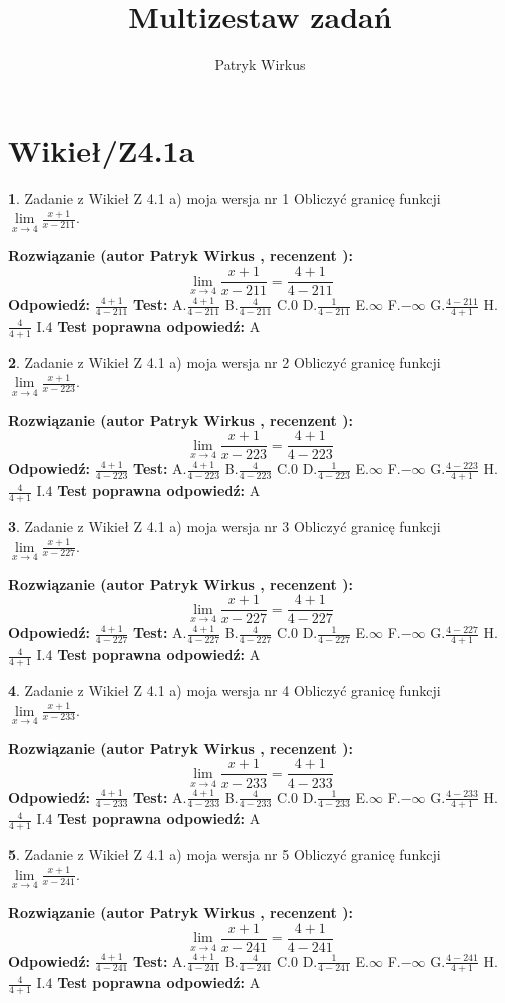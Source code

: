 \documentclass[12pt, a4paper]{article}
\title{Multizestaw zadań}
\author{Patryk Wirkus}
\date{}
\theoremstyle{definition} %
\newtheorem{zad}{}
\newcommand{\kategoria}[1]{\section{#1}}
\newcommand{\zadStart}[1]{\begin{zad}#1\newline}
\newcommand{\zadStop}{\end{zad}}
\newcommand{\rozwStart}[2]{\noindent \textbf{Rozwiązanie (autor #1 , recenzent #2): }\newline}
\newcommand{\rozwStop}{\newline}
\newcommand{\odpStart}{\noindent \textbf{Odpowiedź:}\newline}
\newcommand{\odpStop}{\newline}
\newcommand{\testStart}{\noindent \textbf{Test:}\newline}
\newcommand{\testStop}{\newline}
\newcommand{\kluczStart}{\noindent \textbf{Test poprawna odpowiedź:}\newline}
\newcommand{\kluczStop}{\newline}
\begin{document}
\maketitle

\kategoria{Wikieł/Z4.1a}


\zadStart{Zadanie z Wikieł Z 4.1 a) moja wersja nr 1}
Obliczyć granicę funkcji $\lim\limits_{x\to4}\frac{x+1}{x-211}$.
\zadStop
\rozwStart{Patryk Wirkus}{}
$$\lim\limits_{x\to4}\frac{x+1}{x-211} = \frac{4+1}{4-211}$$
\rozwStop
\odpStart
$\frac{4+1}{4-211}$
\odpStop
\testStart
A.$\frac{4+1}{4-211}$
B.$\frac{4}{4-211}$
C.$0$
D.$\frac{1}{4-211}$
E.$\infty$
F.$-\infty$
G.$\frac{4-211}{4+1}$
H.$\frac{4}{4+1}$
I.$4$
\testStop
\kluczStart
A
\kluczStop



\zadStart{Zadanie z Wikieł Z 4.1 a) moja wersja nr 2}
Obliczyć granicę funkcji $\lim\limits_{x\to4}\frac{x+1}{x-223}$.
\zadStop
\rozwStart{Patryk Wirkus}{}
$$\lim\limits_{x\to4}\frac{x+1}{x-223} = \frac{4+1}{4-223}$$
\rozwStop
\odpStart
$\frac{4+1}{4-223}$
\odpStop
\testStart
A.$\frac{4+1}{4-223}$
B.$\frac{4}{4-223}$
C.$0$
D.$\frac{1}{4-223}$
E.$\infty$
F.$-\infty$
G.$\frac{4-223}{4+1}$
H.$\frac{4}{4+1}$
I.$4$
\testStop
\kluczStart
A
\kluczStop



\zadStart{Zadanie z Wikieł Z 4.1 a) moja wersja nr 3}
Obliczyć granicę funkcji $\lim\limits_{x\to4}\frac{x+1}{x-227}$.
\zadStop
\rozwStart{Patryk Wirkus}{}
$$\lim\limits_{x\to4}\frac{x+1}{x-227} = \frac{4+1}{4-227}$$
\rozwStop
\odpStart
$\frac{4+1}{4-227}$
\odpStop
\testStart
A.$\frac{4+1}{4-227}$
B.$\frac{4}{4-227}$
C.$0$
D.$\frac{1}{4-227}$
E.$\infty$
F.$-\infty$
G.$\frac{4-227}{4+1}$
H.$\frac{4}{4+1}$
I.$4$
\testStop
\kluczStart
A
\kluczStop



\zadStart{Zadanie z Wikieł Z 4.1 a) moja wersja nr 4}
Obliczyć granicę funkcji $\lim\limits_{x\to4}\frac{x+1}{x-233}$.
\zadStop
\rozwStart{Patryk Wirkus}{}
$$\lim\limits_{x\to4}\frac{x+1}{x-233} = \frac{4+1}{4-233}$$
\rozwStop
\odpStart
$\frac{4+1}{4-233}$
\odpStop
\testStart
A.$\frac{4+1}{4-233}$
B.$\frac{4}{4-233}$
C.$0$
D.$\frac{1}{4-233}$
E.$\infty$
F.$-\infty$
G.$\frac{4-233}{4+1}$
H.$\frac{4}{4+1}$
I.$4$
\testStop
\kluczStart
A
\kluczStop



\zadStart{Zadanie z Wikieł Z 4.1 a) moja wersja nr 5}
Obliczyć granicę funkcji $\lim\limits_{x\to4}\frac{x+1}{x-241}$.
\zadStop
\rozwStart{Patryk Wirkus}{}
$$\lim\limits_{x\to4}\frac{x+1}{x-241} = \frac{4+1}{4-241}$$
\rozwStop
\odpStart
$\frac{4+1}{4-241}$
\odpStop
\testStart
A.$\frac{4+1}{4-241}$
B.$\frac{4}{4-241}$
C.$0$
D.$\frac{1}{4-241}$
E.$\infty$
F.$-\infty$
G.$\frac{4-241}{4+1}$
H.$\frac{4}{4+1}$
I.$4$
\testStop
\kluczStart
A
\kluczStop
\end{document}
